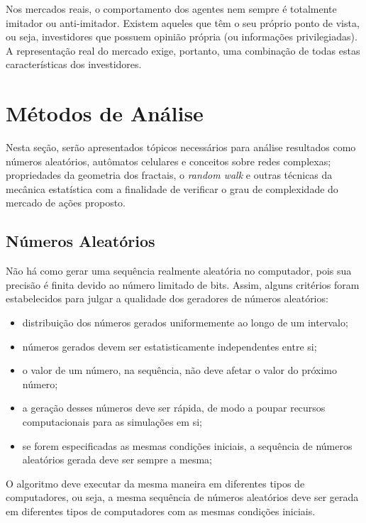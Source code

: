 \documentclass[brazil,ruledheader]{abnt}
\begin{document}
Nos mercados reais, o comportamento dos agentes nem sempre é totalmente
imitador ou anti-imitador. Existem aqueles que têm o seu próprio ponto de
vista, ou seja, investidores que possuem opinião própria (ou
informações privilegiadas). A representação real do mercado exige, portanto, uma
combinação de
todas estas características dos investidores.

\chapter{Métodos de Análise}\label{Métodos-de-Análise}

Nesta seção, serão apresentados  tópicos necessários para análise resultados
como  números aleatórios,  autômatos celulares
e conceitos sobre redes complexas; propriedades da geometria dos fractais, o
\emph{random
walk} e
outras técnicas da mecânica estatística com a finalidade de verificar o grau
de complexidade do mercado de ações proposto.

\section{Números Aleatórios}

Não há como gerar uma sequência realmente aleatória no computador, pois sua
precisão é finita devido ao número limitado de bits.  Assim, alguns critérios
foram estabelecidos para julgar a qualidade dos geradores de números aleatórios:

\begin{itemize}
\item distribuição dos números gerados uniformemente ao longo de um intervalo;
\item números gerados devem ser estatisticamente independentes entre si;
\item o valor de um número, na sequência, não deve afetar o valor do próximo
número;
\item a geração desses números deve ser rápida, de modo a poupar recursos
computacionais para as simulações em si;
\item se forem especificadas as mesmas condições iniciais, a sequência de
números aleatórios gerada deve ser sempre a mesma;
\end{itemize}

O algoritmo deve executar da mesma maneira em diferentes tipos de computadores,
ou seja, a mesma sequência de números aleatórios deve ser gerada em diferentes
tipos de computadores com as mesmas condições iniciais.
\end{document}
